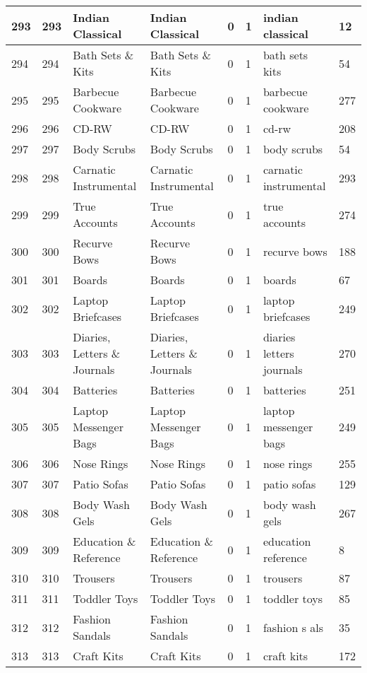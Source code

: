 \begin{longtable}{|l|l|l|l|l|l|l|l|}
293 & 293 & Indian Classical & Indian Classical & 0 & 1 & indian classical & 12 \\ \hline 
294 & 294 & Bath Sets \& Kits & Bath Sets \& Kits & 0 & 1 & bath sets kits & 54 \\ \hline 
295 & 295 & Barbecue Cookware & Barbecue Cookware & 0 & 1 & barbecue cookware & 277 \\ \hline 
296 & 296 & CD-RW & CD-RW & 0 & 1 & cd-rw & 208 \\ \hline 
297 & 297 & Body Scrubs & Body Scrubs & 0 & 1 & body scrubs & 54 \\ \hline 
298 & 298 & Carnatic Instrumental & Carnatic Instrumental & 0 & 1 & carnatic instrumental & 293 \\ \hline 
299 & 299 & True Accounts & True Accounts & 0 & 1 & true accounts & 274 \\ \hline 
300 & 300 & Recurve Bows & Recurve Bows & 0 & 1 & recurve bows & 188 \\ \hline 
301 & 301 & Boards & Boards & 0 & 1 & boards & 67 \\ \hline 
302 & 302 & Laptop Briefcases & Laptop Briefcases & 0 & 1 & laptop briefcases & 249 \\ \hline 
303 & 303 & Diaries, Letters \& Journals & Diaries, Letters \& Journals & 0 & 1 & diaries letters journals & 270 \\ \hline 
304 & 304 & Batteries & Batteries & 0 & 1 & batteries & 251 \\ \hline 
305 & 305 & Laptop Messenger Bags & Laptop Messenger Bags & 0 & 1 & laptop messenger bags & 249 \\ \hline 
306 & 306 & Nose Rings & Nose Rings & 0 & 1 & nose rings & 255 \\ \hline 
307 & 307 & Patio Sofas & Patio Sofas & 0 & 1 & patio sofas & 129 \\ \hline 
308 & 308 & Body Wash Gels & Body Wash Gels & 0 & 1 & body wash gels & 267 \\ \hline 
309 & 309 & Education \& Reference & Education \& Reference & 0 & 1 & education reference & 8 \\ \hline 
310 & 310 & Trousers & Trousers & 0 & 1 & trousers & 87 \\ \hline 
311 & 311 & Toddler Toys & Toddler Toys & 0 & 1 & toddler toys & 85 \\ \hline 
312 & 312 & Fashion Sandals & Fashion Sandals & 0 & 1 & fashion s als & 35 \\ \hline 
313 & 313 & Craft Kits & Craft Kits & 0 & 1 & craft kits & 172 \\ \hline 

\end{longtable}
